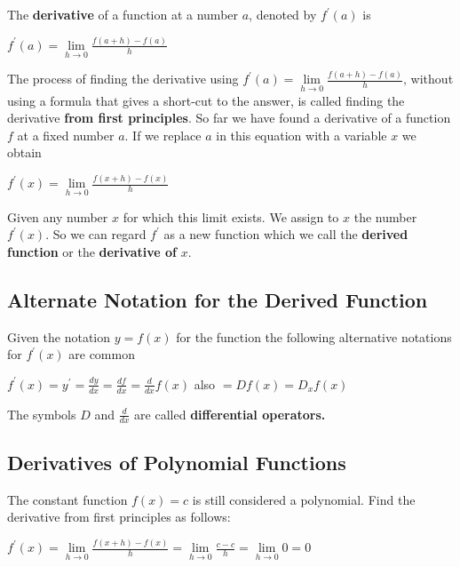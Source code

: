 The \textbf{derivative} of a function at a number $a$, denoted by $f^{ \prime } (a)$ is 
\begin{tcolorbox}
\begin{center}
$f^{ \prime } (a) =\underset{h \rightarrow 0}{\lim }\frac{f (a +h) -f (a)}{h}$
\end{center}
\end{tcolorbox}

The process of finding the derivative using $f^{ \prime } (a) =\underset{h \rightarrow 0}{\lim }\frac{f (a +h) -f (a)}{h}\text{,}$ without using a formula that gives a short-cut to the answer, is called finding the derivative \textbf{from first principles}. So far we have found a derivative of a function $f$ at a fixed number $a$. If we replace $a$ in this equation with a variable $x$ we obtain 

\begin{center}
$f^{ \prime } (x) =\underset{h \rightarrow 0}{\lim }\frac{f (x +h) -f (x)}{h}$
\end{center}\par
Given any number $x$ for which this limit exists. We assign to $x$ the number $f^{ \prime } \left (x\right )$. So we can regard $f^{ \prime }$ as a new function which we call the \textbf{derived function} or the \textbf{derivative of }$x$. 

\subsection*{Alternate Notation for the Derived Function}
Given the notation $y =f (x)$ for the function the following alternative notations for $f^{ \prime } \left (x\right )$ are common 

\begin{center}
$f^{ \prime } (x) =y^{ \prime } =\frac{d y}{d x} =\frac{d f}{d x} =\frac{d}{d x} f (x)$ also $ =D f (x) =D_{x} f (x)$\\
\end{center}
The symbols $D$ and $\frac{d}{d x}$ are called \textbf{differential operators.} 


\subsection*{Derivatives of Polynomial Functions}
The constant function $f (x) =c$ is still considered a polynomial. Find the derivative  from first principles as follows: 

\begin{center}
$f^{ \prime } (x) =\underset{h \rightarrow 0}{\lim }\frac{f (x +h) -f (x)}{h} =\underset{h \rightarrow 0}{\lim }\frac{c -c}{h} =\underset{h \rightarrow 0}{\lim }0 =0$
\end{center}\par


